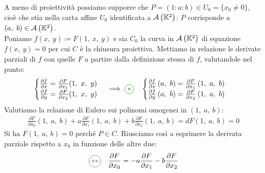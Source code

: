 \begin{demonstration}
	A meno di proiettività possiamo supporre che $P=(1\colon a\colon b)\in U_0=\{x_0\neq 0\}$, cioè che stia nella carta affine $U_0$ identificata a ${\mathcal{A}\left(\mathbb{K}^2\right)}$: $P$ corrisponde a $\left(a,\ b\right)\in\aff{\kamp^2}$.\\
	Poniamo $f\left(x,\ y\right)\coloneqq F(1,\ x,\ y)$ e sia $C_0$ la curva in ${\mathcal{A}\left(\mathbb{K}^2\right)}$ di equazione $f\left(x,\ y\right)=0$ per cui $C$ è la chiusura proiettiva. Mettiamo in relazione le derivate parziali di $f$ con quelle $F$ a partire dalla definizione stessa di $f$, 
	valutandole nel punto:
		\begin{gather*}
			\begin{cases}
				\frac{\partial{f}}{\partial{x}} = \frac{\partial{F}}{\partial{x_1}} (1,\ x,\ y)\\
				\frac{\partial{f}}{\partial{y}} = \frac{\partial{F}}{\partial{x_2}} (1,\ x,\ y)
			\end{cases}
			\implies \textcolor{green}{\circled{\ast}}\quad
			\begin{cases}
				\frac{\partial{f}}{\partial{x}}\left(a,\ b\right) = \frac{\partial{F}}{\partial{x_1}} \left(1,\ a,\ b\right)\\
				\frac{\partial{f}}{\partial{y}}\left(a,\ b\right) = \frac{\partial{F}}{\partial{x_2}} \left(1,\ a,\ b\right)
			\end{cases}
		\end{gather*}
	Valutiamo la relazione di Eulero sui polinomi omogenei in $\left(1,\ a,\ b\right)$:
		\begin{gather*}
			\frac{\partial{F}}{\partial{x_0}}\left(1,\ a,\ b\right) + a\frac{\partial{F}}{\partial{x_1}}\left(1,\ a,\ b\right) + b\frac{\partial{F}}{\partial{x_2}}\left(1,\ a,\ b\right)= dF\left(1,\ a,\ b\right)=0
		\end{gather*}
	Si ha $F\left(1,\ a,\ b\right)=0$ perché $P\in C$. Riusciamo così a esprimere la derivata parziale rispetto a $x_0$ in funzione delle altre due:
		\begin{gather*}
			\textcolor{green}{\circled{\ast\ast}}\quad \frac{\partial{F}}{\partial{x_0}}=-a\frac{\partial{F}}{\partial{x_1}} -b\frac{\partial{F}}{\partial{x_2}}

\end{gather*}
\end{demonstration}
